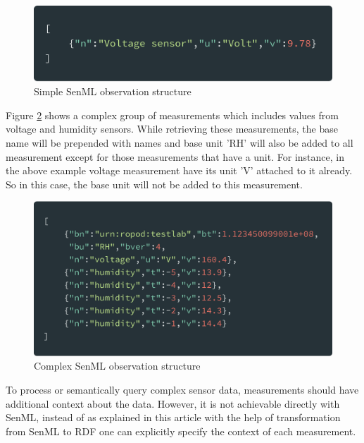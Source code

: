     \begin{figure}[!htbp] 
    	\begin{center}
    		\includegraphics[scale=0.1]{./images/png/senml/simple}	
    		\caption{Simple SenML observation structure}	
    		\label{fig:senml_simple}	
    	\end{center}
    \end{figure}

       
    
    
    Figure \ref{fig:senml_complex} shows a complex group of measurements which includes values from voltage and humidity sensors. While retrieving these measurements, the base name will be prepended with names and base unit 'RH' will also be added to all measurement except for those measurements that have a unit. For instance, in the above example voltage measurement have its unit 'V' attached to it already. So in this case, the base unit will not be added to this measurement.
    
    \begin{figure}[!htbp] 
    	\begin{center}
    		\includegraphics[clip,scale=0.14]{./images/png/senml/complex}	
    		\caption{Complex SenML observation structure}	
    		\label{fig:senml_complex}	
    	\end{center}
    \end{figure}

	To process or semantically query complex sensor data, measurements should have additional context about the data. However, it is not achievable directly with SenML, instead of as explained in this article \cite{su2014connecting} with the help of transformation from SenML to RDF one can explicitly specify the context of each measurement.
	
